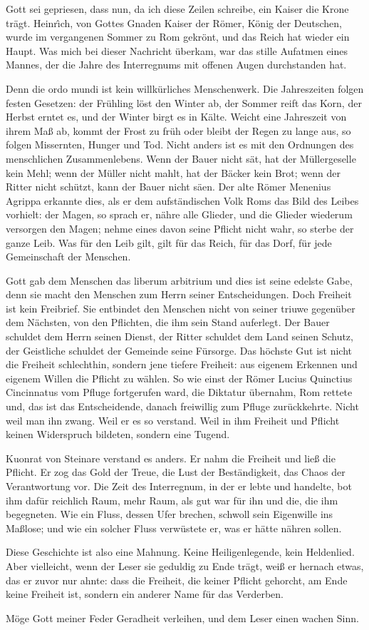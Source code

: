 Gott sei gepriesen, dass nun, da ich diese Zeilen schreibe, ein Kaiser die Krone trägt. Heinr\^{\i}ch, von Gottes Gnaden Kaiser der Römer, König der Deutschen, wurde im vergangenen Sommer zu Rom gekrönt, und das Reich hat wieder ein Haupt. Was mich bei dieser Nachricht überkam, war das stille Aufatmen eines Mannes, der die Jahre des \gls{Interregnum}s mit offenen Augen durchstanden hat.

Denn die \gls{ordo mundi} ist kein willkürliches Menschenwerk. Die Jahreszeiten folgen festen Gesetzen: der Frühling löst den Winter ab, der Sommer reift das Korn, der Herbst erntet es, und der Winter birgt es in Kälte. Weicht eine Jahreszeit von ihrem Maß ab, kommt der Frost zu früh oder bleibt der Regen zu lange aus, so folgen Missernten, Hunger und Tod. Nicht anders ist es mit den Ordnungen des menschlichen Zusammenlebens. Wenn der Bauer nicht sät, hat der Müllergeselle kein Mehl; wenn der Müller nicht mahlt, hat der Bäcker kein Brot; wenn der Ritter nicht schützt, kann der Bauer nicht säen. Der alte Römer Menenius Agrippa erkannte dies, als er dem aufständischen Volk Roms das Bild des Leibes vorhielt: der Magen, so sprach er, nähre alle Glieder, und die Glieder wiederum versorgen den Magen; nehme eines davon seine Pflicht nicht wahr, so sterbe der ganze Leib. Was für den Leib gilt, gilt für das Reich, für das Dorf, für jede Gemeinschaft der Menschen.

Gott gab dem Menschen das \gls{liberum arbitrium} und dies ist seine edelste Gabe, denn sie macht den Menschen zum Herrn seiner Entscheidungen. Doch Freiheit ist kein Freibrief. Sie entbindet den Menschen nicht von seiner \gls{triuwe} gegenüber dem Nächsten, von den Pflichten, die ihm sein Stand auferlegt. Der Bauer schuldet dem Herrn seinen Dienst, der Ritter schuldet dem Land seinen Schutz, der Geistliche schuldet der Gemeinde seine Fürsorge. Das höchste Gut ist nicht die Freiheit schlechthin, sondern jene tiefere Freiheit: aus eigenem Erkennen und eigenem Willen die Pflicht zu wählen. So wie einst der Römer Lucius Quinctius Cincinnatus vom Pfluge fortgerufen ward, die Diktatur übernahm, Rom rettete und, das ist das Entscheidende, danach freiwillig zum Pfluge zurückkehrte. Nicht weil man ihn zwang. Weil er es so verstand. Weil in ihm Freiheit und Pflicht keinen Widerspruch bildeten, sondern eine Tugend.

\gls{Kuonrat von Steinare} verstand es anders. Er nahm die Freiheit und ließ die Pflicht. Er zog das Gold der Treue, die Lust der Beständigkeit, das Chaos der Verantwortung vor. Die Zeit des \gls{Interregnum}, in der er lebte und handelte, bot ihm dafür reichlich Raum, mehr Raum, als gut war für ihn und die, die ihm begegneten. Wie ein Fluss, dessen Ufer brechen, schwoll sein Eigenwille ins Maßlose; und wie ein solcher Fluss verwüstete er, was er hätte nähren sollen.

Diese Geschichte ist also eine Mahnung. Keine Heiligenlegende, kein Heldenlied. Aber vielleicht, wenn der Leser sie geduldig zu Ende trägt, weiß er hernach etwas, das er zuvor nur ahnte: dass die Freiheit, die keiner Pflicht gehorcht, am Ende keine Freiheit ist, sondern ein anderer Name für das Verderben.

Möge Gott meiner Feder Geradheit verleihen, und dem Leser einen wachen Sinn.
